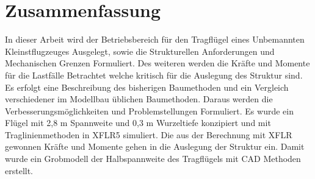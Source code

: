 \chapter*{Zusammenfassung}

In dieser Arbeit wird der Betriebsbereich für den Tragflügel eines Unbemannten Kleinstflugzeuges Ausgelegt, sowie die Strukturellen Anforderungen und Mechanischen Grenzen Formuliert. Des weiteren werden die Kräfte und Momente für die Lastfälle Betrachtet welche kritisch für die Auslegung des Struktur sind.
Es erfolgt eine Beschreibung des bisherigen Baumethoden und ein Vergleich verschiedener im Modellbau üblichen Baumethoden.
Daraus werden die Verbesserungsmöglichkeiten und Problemstellungen Formuliert.
Es wurde ein Flügel mit 2,8 m Spannweite und 0,3 m Wurzeltiefe konzipiert und mit Traglinienmethoden in XFLR5 simuliert.
Die aus der Berechnung mit XFLR gewonnen Kräfte und Momente gehen in die Auslegung der Struktur ein.
Damit wurde ein Grobmodell der Halbspannweite des Tragflügels mit CAD Methoden erstellt.
